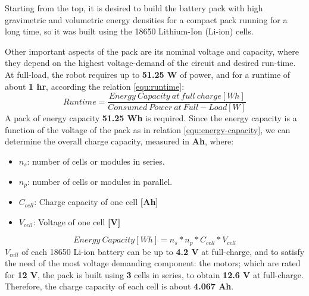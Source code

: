 Starting from the top, it is desired to build the battery pack with high gravimetric and volumetric energy densities for a compact pack running for a long time, so it was built using the 18650 Lithium-Ion (Li-ion) cells. \cite{cellComp}


Other important aspects of the pack are its nominal voltage and capacity, where they depend on the highest voltage-demand of the circuit and desired run-time. At full-load, the robot requires up to \textbf{51.25 W} of power, and for a runtime of about \textbf{1 hr}, according the relation \ref{equ:runtime}:
\begin{equation}
    Runtime = \frac{Energy\ Capacity\ at\ full\ charge[Wh]}{Consumed\ Power\ at\ Full-Load[W]}
    \label{equ:runtime}
\end{equation}
A pack of energy capacity \textbf{51.25 Wh} is required. Since the energy capacity is a function of the voltage of the pack as in relation \ref{equ:energy-capacity}, we can determine the overall charge capacity, measured in \textbf{Ah}, where:
\begin{itemize}
    \item $n_s$: number of cells or modules in series.
    \item $n_p$: number of cells or modules in parallel.
    \item $C_{cell}$: Charge capacity of one cell \textbf{[Ah]}
    \item $V_{cell}$: Voltage of one cell \textbf{[V]}
\end{itemize}
\newpage
\begin{equation}
    Energy\ Capacity[Wh] = n_s * n_p * C_{cell} * V_{cell}
    \label{equ:energy-capacity}
\end{equation} %
\textbf{$V_{cell}$} of each 18650 Li-ion battery can be up to \textbf{4.2 V} at full-charge, and to satisfy the need of the most voltage demanding component: the motors; which are rated for \textbf{12 V}, the pack is built using \textbf{3} cells in series, to obtain \textbf{12.6 V} at full-charge. Therefore, the charge capacity of each cell is about \textbf{4.067 Ah}. 

